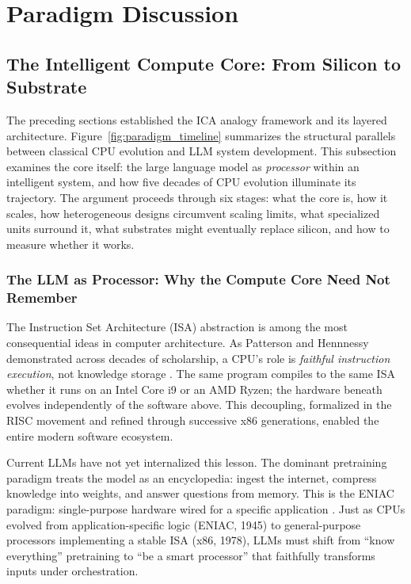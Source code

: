 \section{Paradigm Discussion}
\label{sec:paradigm}



\subsection{The Intelligent Compute Core: From Silicon to Substrate}

The preceding sections established the ICA analogy framework and its layered architecture. Figure~\ref{fig:paradigm_timeline} summarizes the structural parallels between classical CPU evolution and LLM system development. This subsection examines the core itself: the large language model as \textit{processor} within an intelligent system, and how five decades of CPU evolution illuminate its trajectory. The argument proceeds through six stages: what the core is, how it scales, how heterogeneous designs circumvent scaling limits, what specialized units surround it, what substrates might eventually replace silicon, and how to measure whether it works.



\subsubsection{The LLM as Processor: Why the Compute Core Need Not Remember}

The Instruction Set Architecture (ISA) abstraction is among the most consequential ideas in computer architecture. As Patterson and Hennnessy demonstrated across decades of scholarship, a CPU's role is \textit{faithful instruction execution}, not knowledge storage \cite{patterson_hennessy_2017}. The same program compiles to the same ISA whether it runs on an Intel Core i9 or an AMD Ryzen; the hardware beneath evolves independently of the software above. This decoupling, formalized in the RISC movement and refined through successive x86 generations, enabled the entire modern software ecosystem.

Current LLMs have not yet internalized this lesson. The dominant pretraining paradigm treats the model as an encyclopedia: ingest the internet, compress knowledge into weights, and answer questions from memory. This is the ENIAC paradigm: single-purpose hardware wired for a specific application \cite{patterson_hennessy_2017}. Just as CPUs evolved from application-specific logic (ENIAC, 1945) to general-purpose processors implementing a stable ISA (x86, 1978), LLMs must shift from ``know everything'' pretraining to ``be a smart processor'' that faithfully transforms inputs under orchestration.

